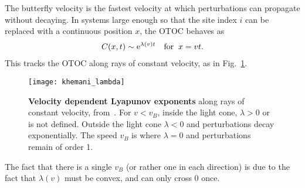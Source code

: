 The butterfly velocity is the fastest velocity at which perturbations can propagate without decaying. In systems large enough so that the site index $i$ can be replaced with a continuous position $x$, the OTOC behaves as~\cite{Khemani2018}
\begin{align}
C(x,t)\sim \text{e}^{\lambda(v)t}\quad\text{for}\;\;x=vt.\label{eqn:butterfly}
\end{align}
This tracks the OTOC along rays of constant velocity, as in Fig.~\ref{fig:khemani_lambda}.
\begin{figure}
	\centering
	\texttt{[image: khemani\_lambda]}
	\caption{\textbf{Velocity dependent Lyapunov exponents} along rays of constant velocity, from~\cite{Khemani2018}. For $v<v_B$, inside the light cone, $\lambda>0$ or is not defined. Outside the light cone $\lambda<0$ and perturbations decay exponentially. The speed $v_B$ is where $\lambda=0$ and perturbations remain of order 1.}
	\label{fig:khemani_lambda}
\end{figure}
The fact that there is a single $v_B$ (or rather one in each direction) is due to the fact that $\lambda(v)$ must be convex, and can only cross 0 once.
